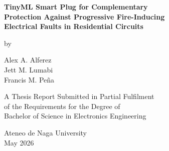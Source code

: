\begin{titlepage}
\thispagestyle{empty}
\begin{center}
\begingroup
{}
\setlength{\parskip}{0pt}
\setlength{\parindent}{0pt}
\fontsize{12}{14.4}\selectfont
\vspace*{5\baselineskip}

{\bfseries\fontsize{20}{24}\selectfont
TinyML Smart Plug for Complementary\\
Protection Against Progressive Fire-Inducing\\
Electrical Faults in Residential Circuits\par}

\vspace{8\baselineskip}

{\fontsize{14}{16.8}\selectfont by\par}

\vspace{\baselineskip}

{\fontsize{14}{16.8}\selectfont
Alex A. Alferez\\
Jett M. Lumabi\\
Francis M. Pe\~{n}a\par}

\vspace{7\baselineskip}

{\fontsize{14}{16.8}\selectfont
A Thesis Report Submitted in Partial Fulfilment\\
of the Requirements for the Degree of\\
Bachelor of Science in Electronics Engineering\par}

\vspace{7\baselineskip}

{\fontsize{14}{16.8}\selectfont
Ateneo de Naga University\\
May 2026\par}
\endgroup

\end{center}
\end{titlepage}
